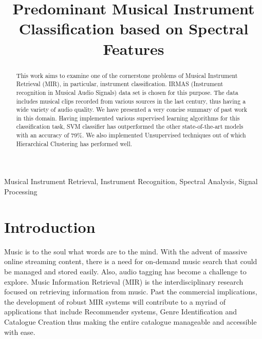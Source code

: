 \documentclass[conference]{IEEEtran}
\begin{document}
\title{Predominant Musical Instrument Classification based on Spectral Features
}

\author{
}
\renewcommand{\headrulewidth}{0pt} 
\maketitle
\thispagestyle{fancy}

\begin{abstract}
This work aims to examine one of the cornerstone problems of Musical Instrument Retrieval (MIR), in particular, instrument classification. IRMAS (Instrument recognition in Musical Audio Signals) data set is chosen for this purpose. The data includes musical clips recorded from various sources in the last century, thus having a wide variety of audio quality. We have presented a very concise summary of past work in this domain. Having implemented various supervised learning algorithms for this classification task, SVM classifier has outperformed the other state-of-the-art models with an accuracy of 79\%. We also implemented Unsupervised techniques out of which Hierarchical Clustering has performed well. 
\end{abstract}

\begin{IEEEkeywords}
Musical Instrument Retrieval, Instrument Recognition, Spectral Analysis, Signal Processing
\end{IEEEkeywords}



	
\section{Introduction}
Music is to the soul what words are to the mind. With the advent of massive online streaming content, there is a need for on-demand music search that could be managed and stored easily. Also, audio tagging has become a challenge to explore. Music Information Retrieval (MIR) is the interdisciplinary research focused on retrieving information from music. Past the commercial implications, the development of robust MIR systems will contribute to a myriad of applications that include Recommender systems, Genre Identification and Catalogue Creation thus making the entire catalogue manageable and accessible with ease.
\end{document}

